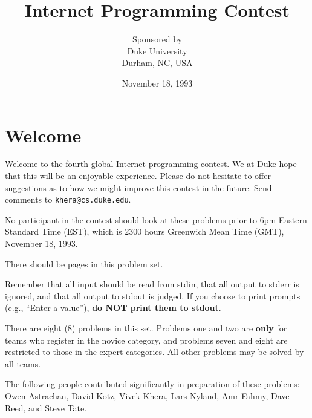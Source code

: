 
\sloppy

\setlength{\textwidth}{6.5in}
\setlength{\textheight}{9in}
\setlength{\topmargin}{-0.5in}
\setlength{\oddsidemargin}{0pt}
\setlength{\evensidemargin}{0pt}

\pagestyle{headings}



\title{Internet Programming Contest}
\author{Sponsored by \\Duke University\\Durham, NC, USA}
\date{November 18, 1993}
\maketitle

\section*{Welcome}
Welcome to the fourth global Internet programming contest.  We at Duke
hope that this will be an enjoyable experience.  Please do not hesitate
to offer suggestions as to how we might improve this contest in the
future.  Send comments to \mbox{\tt khera@cs.duke.edu}.

\vspace*{.5in}
{\large No participant in the contest should look at these problems
prior to {\sc 6pm} Eastern Standard Time (EST), which is 2300 hours
Greenwich Mean Time (GMT), November 18, 1993.}

There should be \pageref{lastpage} pages in this problem set.

\vspace*{.5in}

Remember that all input should be read from stdin, that all output to
stderr is ignored, and that all output to stdout is judged.  If you
choose to print prompts (e.g., ``Enter a value''), {\bf do NOT print
them to stdout}.

There are eight (8) problems in this set.  Problems one and two are
{\bf only} for teams who register in the novice category, and
problems seven and eight are restricted to those in the expert
categories.  All other problems may be solved by all teams.

\vspace*{.5in}

The following people contributed significantly in preparation of these
problems: Owen Astrachan, David Kotz, Vivek Khera, Lars Nyland, Amr
Fahmy, Dave Reed, and Steve Tate.
\vspace*{.5in}

